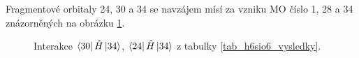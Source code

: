 \documentclass[
  digital, %
  table,   %
  lof,     %
  lot,     %
]{fithesis3}
\begin{document}
Fragmentové orbitaly  24, 30 a 34 se navzájem mísí za vzniku MO číslo 1, 28 a 34 znázorněných na obrázku \ref{obr_h6sio6_vysledky_I}.   
\begin{figure}
\begin{center}
\caption{Interakce $\bra{30}{\hat{H}}\ket{34}$, $\bra{24}{\hat{H}}\ket{34}$  z tabulky \ref{tab_h6sio6_vysledky}.}

\label{obr_h6sio6_vysledky_I}\end{center}
\end{figure} 
\end{document}
